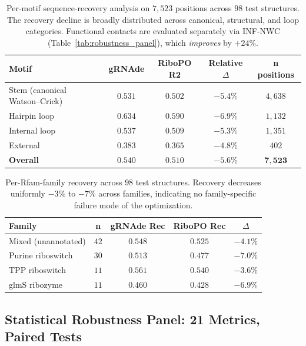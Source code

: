 {{\begin{table}[h]
\centering
\caption{Per-motif sequence-recovery analysis on $7{,}523$ positions across $98$ test structures. The recovery decline is broadly distributed across canonical, structural, and loop categories. Functional contacts are evaluated separately via INF-NWC (Table~\ref{tab:robustness_panel}), which \emph{improves} by $+24\%$.}
\label{tab:per_motif}
\small
\begin{tabular}{lcccc}
\toprule
\textbf{Motif} & \textbf{gRNAde} & \textbf{RiboPO R2} & \textbf{Relative} $\Delta$ & \textbf{n positions} \\
\midrule
Stem (canonical Watson--Crick) & $0.531$ & $0.502$ & $-5.4\%$ & $4{,}638$ \\
Hairpin loop & $0.634$ & $0.590$ & $-6.9\%$ & $1{,}132$ \\
Internal loop & $0.537$ & $0.509$ & $-5.3\%$ & $1{,}351$ \\
External & $0.383$ & $0.365$ & $-4.8\%$ & $402$ \\
\midrule
\textbf{Overall} & $\mathbf{0.540}$ & $\mathbf{0.510}$ & $\mathbf{-5.6\%}$ & $\mathbf{7{,}523}$ \\
\bottomrule
\end{tabular}
\end{table}

\begin{table}[h]
\centering
\caption{Per-Rfam-family recovery across $98$ test structures. Recovery decreases uniformly $-3\%$ to $-7\%$ across families, indicating no family-specific failure mode of the optimization.}
\label{tab:per_family}
\small
\begin{tabular}{lcccc}
\toprule
\textbf{Family} & \textbf{n} & \textbf{gRNAde Rec} & \textbf{RiboPO Rec} & $\Delta$ \\
\midrule
Mixed (unannotated) & $42$ & $0.548$ & $0.525$ & $-4.1\%$ \\
Purine riboswitch & $30$ & $0.513$ & $0.477$ & $-7.0\%$ \\
TPP riboswitch & $11$ & $0.561$ & $0.540$ & $-3.6\%$ \\
glmS ribozyme & $11$ & $0.460$ & $0.428$ & $-6.9\%$ \\
\bottomrule
\end{tabular}
\end{table}


\subsection{Statistical Robustness Panel: 21 Metrics, Paired Tests}
\label{app:robustness_panel}

}}
